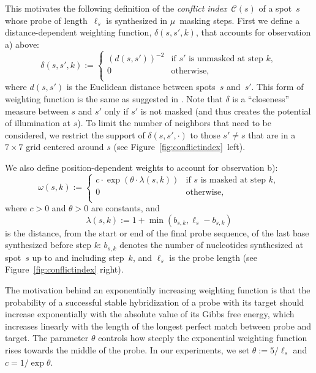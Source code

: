 \documentclass[english]{lni}
\begin{document}
This motivates the following definition of the \emph{conflict
  index}~$\mathcal{C}(s)$ of a spot~$s$ whose probe of
length~$\ell_{s}$ is synthesized in $\mu$~masking steps. First we
define a distance-dependent weighting function, $\delta(s,s',k)$, that
accounts for observation a) above:
\begin{equation}
\label{eq:dist_weight}
\delta(s,s',k) :=
\left\{
	\begin{array}{ll}
		(d(s,s'))^{-2} & \mbox{if $s'$ is unmasked at step $k$}, \\
		0 & \mbox{otherwise}, \\
	\end{array}
\right.
\end{equation}
where $d(s,s')$ is the Euclidean distance between spots~$s$ and~$s'$.
This form of weighting function is the same as suggested in
\cite{KAHNG03A}.  Note that $\delta$ is a ``closeness'' measure
between $s$ and $s'$ only if $s'$ is
not masked (and thus creates the potential of illumination at $s$). To
limit the number of neighbors that need to be considered, we
restrict the support of $\delta(s,s',\cdot)$ to those $s'\neq s$ that
are in a $7\times 7$ grid centered around $s$ (see
Figure~\ref{fig:conflictindex}~left).

We also define position-dependent weights to account for observation b):
\begin{equation}\label{eq:pos_mult}
\omega(s,k) :=
\left\{
	\begin{array}{ll}
		c \cdot \exp{\left(\theta \cdot \lambda(s,k)\right)} & \mbox{if $s$ is masked at step $k$}, \\
		0 & \mbox{otherwise}, \\
	\end{array}
\right.
\end{equation}
where $c>0$ and $\theta>0$ are constants, and
\begin{equation}\label{eq:base_pos}
  \lambda(s,k) := 1 + \min(b_{s,k},\ell_{s} - b_{s,k})
\end{equation}
is the distance, from the start or end of the final probe sequence, of the
last base synthesized before step $k$: $b_{s,k}$ denotes the number of
nucleotides synthesized at spot~$s$ up to and including step~$k$, and
$\ell_s$ is the probe length (see Figure~\ref{fig:conflictindex}
right).

The motivation
behind an exponentially increasing weighting function is that the
probability of a successful stable hybridization of a probe with its
target should increase exponentially with the absolute value of its
Gibbs free energy, which increases linearly with the length of the
longest perfect match between probe and target. The parameter $\theta$
controls how steeply the exponential weighting function rises towards
the middle of the probe. In our experiments, we set $\theta := 5/\ell_s$
and $c = 1/\exp{\theta}$.
\end{document}
